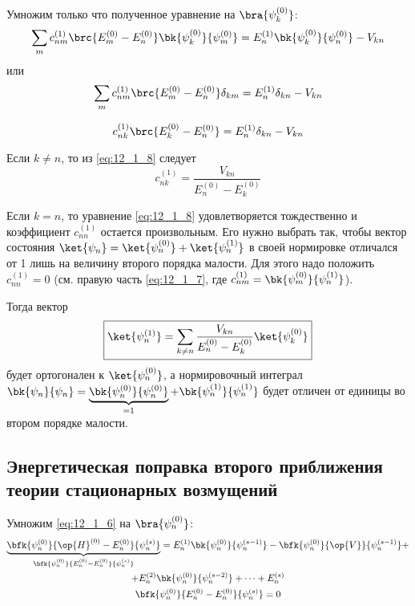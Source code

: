 Умножим только что полученное уравнение на $\bra{\psi_k^{(0)}}$:
$$
\sum_m c_{nm}^{(1)}\brc{E_m^{(0)} - E_n^{(0)}} \bk{\psi_k^{(0)}}{\psi_m^{(0)}} = E_n^{(1)} \bk{\psi_k^{(0)}}{\psi_n^{(0)}} - V_{kn}
$$
или
$$
\sum_m c_{nm}^{(1)}\brc{E_m^{(0)} - E_n^{(0)}} \delta_{km} = E_n^{(1)} \delta_{kn} - V_{kn}
$$

\begin{equation}
\label{eq:12_1_8}
c_{nk}^{(1)} \brc{E_k^{(0)} - E_n^{(0)}} = E_n^{(1)} \delta_{kn} - V_{kn}
\end{equation}

Если $k \neq n$, то из \eqref{eq:12_1_8} следует
\begin{equation}
\label{eq:12_1_9}
c_{nk}^{(1)} = \frac{V_{kn}}{E_n^{(0)} - E_k^{(0)}}
\end{equation}

Если $k = n$, то уравнение \eqref{eq:12_1_8} удовлетворяется тождественно и коэффициент $c_{nn}^{(1)}$ остается произвольным. Его нужно выбрать так, чтобы вектор состояния $\ket{\psi_n} = \ket{\psi_n^{(0)}} + \ket{\psi_n^{(1)}}$ в своей нормировке отличался от 1 лишь на величину второго порядка малости. Для этого надо положить $c_{nn}^{(1)} = 0$ (см. правую часть \eqref{eq:12_1_7}, где $c_{nm}^{(1)} = \bk{\psi_m^{(0)}}{\psi_n^{(1)}}$).

Тогда вектор
\begin{equation}
\label{eq:12_1_10}
\boxed{\ket{\psi_n^{(1)}}= \sum_{k \neq n} \frac{V_{kn}}{E_n^{(0)} - E_k^{(0)}} \ket{\psi_k^{(0)}}}
\end{equation}
будет ортогонален к $\ket{\psi_n^{(0)}}$, а нормировочный интеграл ${\bk{\psi_n}{\psi_n} = \underbrace{\bk{\psi_n^{(0)}}{\psi_n^{(0)}}}_{=1} + \bk{\psi_n^{(1)}}{\psi_n^{(1)}}}$ будет отличен от единицы во втором порядке малости.

\subsection{Энергетическая поправка второго приближения теории стационарных возмущений}

Умножим \eqref{eq:12_1_6} на $\bra{\psi_n^{(0)}}$:
\begin{gather*}
\underbrace{\bfk{\psi_n^{(0)}}{\op{H}^{(0)} - E_n^{(0)}} {\psi_n^{(s)}}}_{\bfk{\psi_n^{(0)}}{E_n^{(0)} - E_n^{(0)}}{\psi_n^{(s)}}} = E_n^{(1)} \bk{\psi_n^{(0)}}{\psi_n^{(s-1)}} - \bfk{\psi_n^{(0)}}{\op{V}}{\psi_n^{(s-1)}} + \\
+ E_n^{(2)}\bk{\psi_n^{(0)}}{\psi_n^{(s-2)}}+\dots+E_n^{(s)}\\
\bfk{\psi_n^{(0)}}{E_n^{(0)} - E_n^{(0)}}{\psi_n^{(s)}} = 0
\end{gather*}

